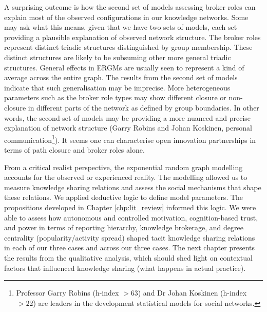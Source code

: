 A surprising outcome is how the second set of models assessing broker roles can explain most of the observed configurations in our knowledge networks. Some may ask what this means, given that we have two sets of models, each set providing a plausible explanation of observed network structure. The broker roles represent distinct triadic structures distinguished by group membership. These distinct structures are likely to be subsuming other more general triadic structures. General effects in ERGMs are usually seen to represent a kind of average across the entire graph. The results from the second set of models indicate that such generalisation may be imprecise. More heterogeneous parameters such as the broker role types may show different closure or non-closure in different parts of the network as defined by group boundaries. In other words, the second set of models may be providing a more nuanced and precise explanation of network structure (Garry Robins and Johan Koskinen, personal communication\footnote{Professor Garry Robins (h-index $> 63$) and Dr Johan Koskinen (h-index $>22$) are leaders in the development statistical models for social networks.}). It seems one can characterise open innovation partnerships in terms of path closure and broker roles alone. \medskip

From a critical realist perspective, the exponential random graph modelling accounts for the observed or experienced reality. The modelling allowed us to measure knowledge sharing relations and assess the social mechanisms that shape these relations. We applied deductive logic to define model parameters. The propositions developed in Chapter \ref{chp:lit_review} informed this logic. We were able to assess how autonomous and controlled motivation, cognition-based trust, and power in terms of reporting hierarchy, knowledge brokerage, and degree centrality (popularity/activity spread) shaped tacit knowledge sharing relations in each of our three cases and across our three cases. The next chapter presents the results from the qualitative analysis, which should shed light on contextual factors that influenced knowledge sharing (what happens in actual practice).